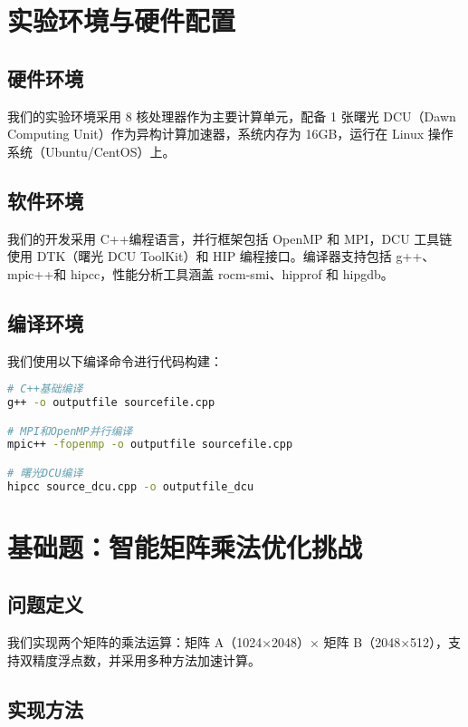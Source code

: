 \documentclass[12pt,a4paper]{article}
\begin{document}
\section{实验环境与硬件配置}

\subsection{硬件环境}

我们的实验环境采用 8 核处理器作为主要计算单元，配备 1 张曙光 DCU（Dawn Computing Unit）作为异构计算加速器，系统内存为 16GB，运行在 Linux 操作系统（Ubuntu/CentOS）上。

\subsection{软件环境}

我们的开发采用 C++编程语言，并行框架包括 OpenMP 和 MPI，DCU 工具链使用 DTK（曙光 DCU ToolKit）和 HIP 编程接口。编译器支持包括 g++、mpic++和 hipcc，性能分析工具涵盖 rocm-smi、hipprof 和 hipgdb。

\subsection{编译环境}

我们使用以下编译命令进行代码构建：

\begin{lstlisting}[language=bash,caption=编译环境配置]
# C++基础编译
g++ -o outputfile sourcefile.cpp

# MPI和OpenMP并行编译
mpic++ -fopenmp -o outputfile sourcefile.cpp

# 曙光DCU编译
hipcc source_dcu.cpp -o outputfile_dcu
\end{lstlisting}

\section{基础题：智能矩阵乘法优化挑战}

\subsection{问题定义}

我们实现两个矩阵的乘法运算：矩阵 A（1024×2048）× 矩阵 B（2048×512），支持双精度浮点数，并采用多种方法加速计算。

\subsection{实现方法}
\end{document}
